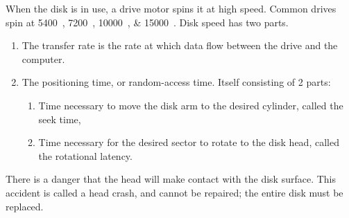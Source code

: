 When the disk is in use, a drive motor spins it at high speed.
Common drives spin at \SIlist{5400; 7200; 10000; 15000}{\rpm}.
Disk speed has two parts.
\begin{enumerate}[noitemsep]
\item The transfer rate is the rate at which data flow between the drive and the computer.
\item The positioning time, or random-access time. Itself consisting of 2 parts:
  \begin{enumerate}[noitemsep]
  \item Time necessary to move the disk arm to the desired cylinder, called the seek time,
  \item Time necessary for the desired sector to rotate to the disk head, called the rotational latency.
  \end{enumerate}
\end{enumerate}

There is a danger that the head will make contact with the disk surface.
This accident is called a head crash, and cannot be repaired; the entire disk must be replaced.


